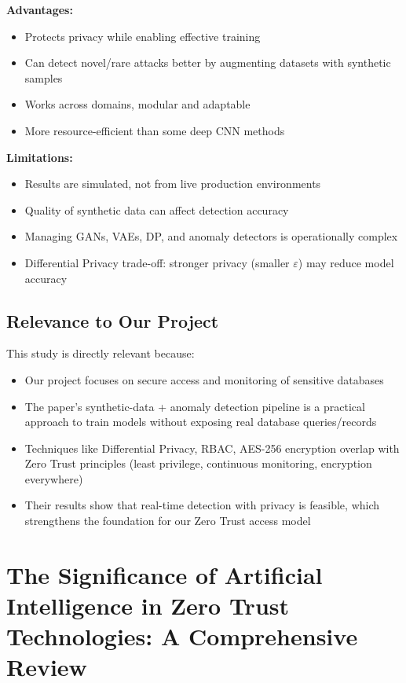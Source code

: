\textbf{Advantages:}

\begin{itemize}
    \item Protects privacy while enabling effective training
    \item Can detect novel/rare attacks better by augmenting datasets with synthetic samples
    \item Works across domains, modular and adaptable
    \item More resource-efficient than some deep CNN methods
\end{itemize}

\textbf{Limitations:}

\begin{itemize}
    \item Results are simulated, not from live production environments
    \item Quality of synthetic data can affect detection accuracy
    \item Managing GANs, VAEs, DP, and anomaly detectors is operationally complex
    \item Differential Privacy trade-off: stronger privacy (smaller $\varepsilon$) may reduce model accuracy
\end{itemize}

\subsection{Relevance to Our Project}

This study is directly relevant because:

\begin{itemize}
    \item Our project focuses on secure access and monitoring of sensitive databases
    \item The paper's synthetic-data + anomaly detection pipeline is a practical approach to train models without exposing real database queries/records
    \item Techniques like Differential Privacy, RBAC, AES-256 encryption overlap with Zero Trust principles (least privilege, continuous monitoring, encryption everywhere)
    \item Their results show that real-time detection with privacy is feasible, which strengthens the foundation for our Zero Trust access model
\end{itemize}

\section{The Significance of Artificial Intelligence in Zero Trust Technologies: A Comprehensive Review}

